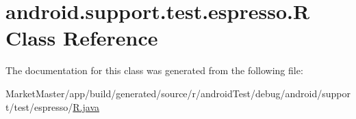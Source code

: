 \hypertarget{classandroid_1_1support_1_1test_1_1espresso_1_1R}{}\section{android.\+support.\+test.\+espresso.\+R Class Reference}
\label{classandroid_1_1support_1_1test_1_1espresso_1_1R}


The documentation for this class was generated from the following file\+:\begin{DoxyCompactItemize}
\item 
Market\+Master/app/build/generated/source/r/android\+Test/debug/android/support/test/espresso/\mbox{\hyperlink{androidTest_2debug_2android_2support_2test_2espresso_2R_8java}{R.\+java}}\end{DoxyCompactItemize}

